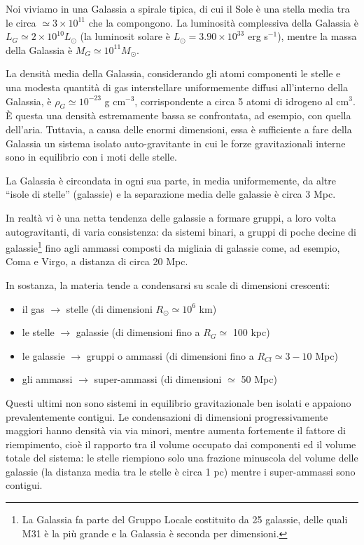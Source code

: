 Noi viviamo in una Galassia a spirale tipica, di cui il Sole è una stella media
tra le circa $\simeq 3 \times 10^{11}$ che la compongono.  La luminosità
complessiva della Galassia è $L_G \simeq 2 \times 10^{10} L_{\odot}$ (la
luminosit solare è $L_{\odot} = 3.90 \times 10^{33}$ erg s$^{-1}$), mentre la
massa della Galassia è $M_G \simeq 10^{11} M_{\odot}$.

La densità media della Galassia, considerando gli atomi componenti le stelle e
una modesta quantità di gas interstellare uniformemente diffusi all'interno
della Galassia, è $\rho_G \simeq 10^{-23}$ g cm$^{-3}$, corrispondente a circa 5
atomi di idrogeno al cm$^{3}$.  È questa una densità estremamente bassa se
confrontata, ad esempio, con quella dell'aria.  Tuttavia, a causa delle enormi
dimensioni, essa è sufficiente a fare della Galassia un sistema isolato
auto-gravitante in cui le forze gravitazionali interne sono in equilibrio con i
moti delle stelle.

La Galassia è circondata in ogni sua parte, in media uniformemente, da altre
``isole di stelle'' (galassie) e la separazione media delle galassie è circa 3
Mpc.

In realtà vi è una netta tendenza delle galassie a formare gruppi, a loro volta
autogravitanti, di varia consistenza: da sistemi binari, a gruppi di poche
decine di galassie\footnote{La Galassia fa parte del Gruppo Locale costituito da
  25 galassie, delle quali M31 è la più grande e la Galassia è seconda per
  dimensioni.} fino agli ammassi composti da migliaia di galassie come, ad
esempio, Coma e Virgo, a distanza di circa 20 Mpc.

In sostanza, la materia tende a condensarsi su scale di dimensioni crescenti:
\begin{itemize}
\item il gas $\to$ stelle (di dimensioni $R_{\odot} \simeq 10^6$ km)
\item le stelle $\to$ galassie (di dimensioni fino a $R_G \simeq$ 100 kpc)
\item le galassie $\to$ gruppi o ammassi (di dimensioni fino a $R_{Cl}\simeq 3-10$ Mpc)
\item gli ammassi $\to$ super-ammassi (di dimensioni $\simeq$ 50 Mpc)
\end{itemize}
Questi ultimi non sono sistemi in equilibrio gravitazionale ben isolati e
appaiono prevalentemente contigui.  Le condensazioni di dimensioni
progressivamente maggiori hanno densità via via minori, mentre aumenta
fortemente il fattore di riempimento, cioè il rapporto tra il volume occupato
dai componenti ed il volume totale del sistema: le stelle riempiono solo una
frazione minuscola del volume delle galassie (la distanza media tra le stelle è
circa 1 pc) mentre i super-ammassi sono contigui.

